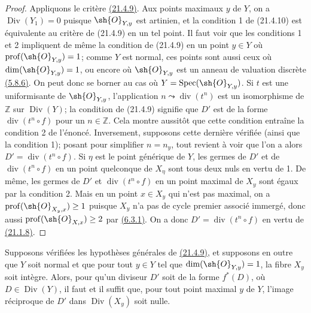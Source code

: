 \begin{proof}
Appliquons le critère {\hyperlink{ega4.c04.prop.21-4-9}{(21.4.9)}}.
Aux points maximaux $y$ de $Y$, on a $\operatorname{Div}(Y_1)=0$
puisque $\sh{O}_{Y,y}$ est artinien, et la condition 1\textdegree{} de
(21.4.10) est équivalente au critère de (21.4.9) en un tel point. Il
faut voir que les conditions 1\textdegree{} et 2\textdegree{} impliquent
de même la condition de (21.4.9) en un point $y\in Y$ où
$\operatorname{prof}(\sh{O}_{Y,y})=1$; comme $Y$ est normal, ces points
sont aussi ceux où $\dim(\sh{O}_{Y,y})=1$, ou encore où
$\sh{O}_{Y,y}$ est un anneau de valuation discrète
{\hyperref[canon-index.ega4.c04.thm.5-8-6]{(5.8.6)}}. On peut donc se borner au
cas où $Y=\operatorname{Spec}(\sh{O}_{Y,y})$. Si $t$ est une
uniformisante de $\sh{O}_{Y,y}$, l'application
$n\leadsto\operatorname{div}(t^n)$ est un isomorphisme de $\mathbb Z$
sur $\operatorname{Div}(Y)$; la condition de (21.4.9) signifie que
$D'$ est de la forme $\operatorname{div}(t^n\circ f)$ pour un
$n\in\mathbb Z$. Cela montre aussitôt que cette condition entraîne la
condition 2\textdegree{} de l'énoncé. Inversement, supposons cette
dernière vérifiée (ainsi que la condition 1\textdegree{}); posant pour
simplifier $n=n_y$, tout revient à voir que l'on a alors
$D'=\operatorname{div}(t^n\circ f)$. Si $\eta$ est le point générique
de $Y$, les germes de $D'$ et de $\operatorname{div}(t^n\circ f)$ en
un point quelconque de $X_\eta$ sont tous deux nuls en vertu de
1\textdegree{}. De même, les germes de $D'$ et
$\operatorname{div}(t^n\circ f)$ en un point maximal de $X_y$ sont
égaux par la condition 2\textdegree{}. Mais en un point $x\in X_y$ qui
n'est pas maximal, on a
$\operatorname{prof}(\sh{O}_{X_y,x})\geq1$ puisque $X_y$ n'a pas de
cycle premier associé immergé, donc aussi
$\operatorname{prof}(\sh{O}_{X,x})\geq2$ par
{\hyperref[canon-index.ega4.c04.prop.6-3-1]{(6.3.1)}}. On a donc
$D'=\operatorname{div}(t^n\circ f)$ en vertu de
{\hyperlink{ega4.c04.prop.21-1-8}{(21.1.8)}}.
\end{proof}

\begin{corollary}[21.4.11]
Supposons vérifiées les hypothèses générales de
\textup{\hyperlink{ega4.c04.prop.21-4-9}{(21.4.9)}}, et supposons en outre que
$Y$ soit normal et que pour tout $y\in Y$ tel que
$\dim(\sh{O}_{Y,y})=1$, la fibre $X_y$ soit intègre. Alors, pour qu'un
diviseur $D'$ soit de la forme $f^*(D)$, où
$D\in\operatorname{Div}(Y)$, il faut et il suffit que, pour tout point
maximal $y$ de $Y$, l'image réciproque de $D'$ dans
$\operatorname{Div}(X_y)$ soit nulle.
\end{corollary}

